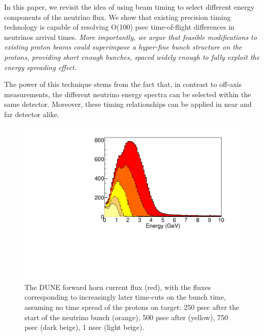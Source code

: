 \documentclass[preprint,12pt]{elsarticle}
\begin{document}
In this paper, we revisit the idea of using beam timing to select different energy components of the neutrino flux. We show that existing precision timing technology is capable of resolving O(100) psec time-of-flight differences in neutrinos arrival times. {\it More importantly, we argue that feasible modifications to existing proton beams could superimpose a hyper-fine bunch structure on the protons, providing short enough bunches, spaced widely enough to fully exploit the energy spreading effect.}

The power of this technique stems from the fact that, in contrast to off-axis measurements, the different neutrino energy spectra can be selected within the same detector. Moreover, these timing relationships can be applied in near and far detector alike.

\begin{figure}[t]
	\begin{center}
           	\includegraphics[width=1.0 \linewidth]{Figures/2018.10.10_LBNFtiming/DUNEbeam_truetimingB.pdf}
	\end{center}
	\caption{The DUNE forward horn current flux (red), with the fluxes corresponding to increasingly later time-cuts on the bunch time, assuming no time spread of the protons on target: 250 psec after the start of the neutrino bunch (orange), 500 psec after (yellow), 750 psec (dark beige), 1 nsec (light beige).}
		\label{fig:anniedetector}
\end{figure}
\end{document}
